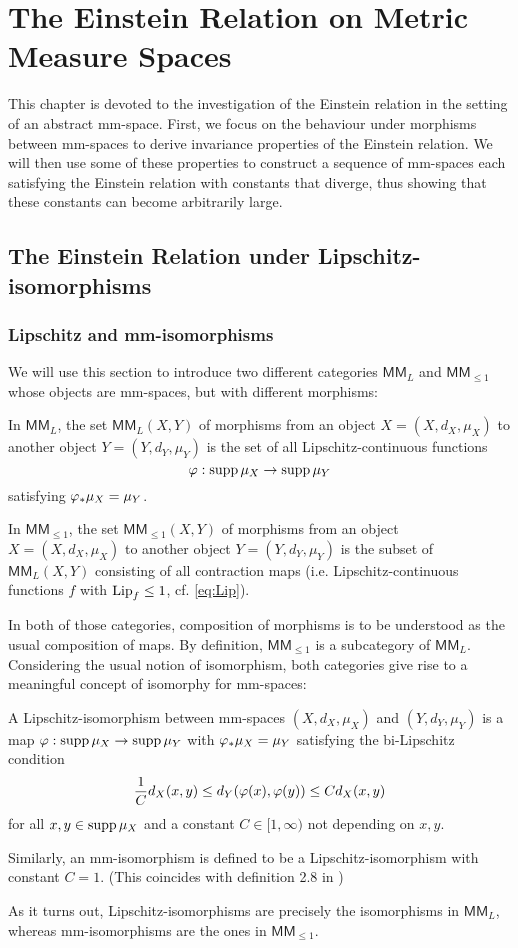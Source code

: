 \chapter{The Einstein Relation on Metric Measure Spaces}

This chapter is devoted to the investigation of the Einstein relation in the setting of an abstract mm-space. First, we focus on the behaviour under morphisms between mm-spaces to derive invariance properties of the Einstein relation.  We will then use some of these properties to construct a sequence of mm-spaces each satisfying the Einstein relation with constants that diverge, thus showing that these constants can become arbitrarily large.

\section{The Einstein Relation under Lipschitz-isomorphisms}

\subsection{Lipschitz and mm-isomorphisms}

We will use this section to introduce two different categories $\mathsf{MM}_L$ and $\mathsf{MM}_{\leq1}$ whose objects are mm-spaces, but with different morphisms: 
\begin{compactitem}
  \item In $\mathsf{MM}_L$, the set $\mathsf{MM}_L(X,Y)$ of morphisms from an object $X=(X,d_X,\mu_X)$ to another object $Y=(Y,d_Y,\mu_Y)$ is the set of all Lipschitz-continuous functions 
  \[ 
    \varphi:\operatorname{supp}\mu_X\to\operatorname{supp}\mu_Y
  \]
  satisfying $\varphi_*\mu_X=\mu_Y$.
  \item In $\mathsf{MM}_{\leq1}$, the set $\mathsf{MM}_{\leq1}(X,Y)$ of morphisms from an object $X=(X,d_X,\mu_X)$ to another object $Y=(Y,d_Y,\mu_Y)$ is the subset of $\mathsf{MM}_L(X,Y)$ consisting of all contraction maps (i.e. Lipschitz-continuous functions $f$ with $\operatorname{Lip}_f\leq1$, cf. \eqref{eq:Lip}).
\end{compactitem}
In both of those categories, composition of morphisms is to be understood as the usual composition of maps. By definition, $\mathsf{MM}_{\leq1}$ is a subcategory of $\mathsf{MM}_L$. Considering the usual notion of isomorphism, both categories give rise to a meaningful concept of isomorphy for mm-spaces: 
\begin{defin}
  A Lipschitz-isomorphism between mm-spaces $(X,d_X,\mu_X)$ and $(Y,d_Y,\mu_Y)$ is a map 
  $\varphi:\operatorname{supp}\mu_X\to\operatorname{supp}\mu_Y$ with $\varphi_*\mu_X=\mu_Y$ satisfying the bi-Lipschitz condition
  \[
    \frac{1}{C}d_X(x,y)\leq d_Y(\varphi(x),\varphi(y))\leq Cd_X(x,y)
  \]
  for all $x,y\in\operatorname{supp}\mu_X$ and a constant $C\in[1,\infty)$ not depending on $x,y$.
  
  Similarly, an mm-isomorphism is defined to be a Lipschitz-isomorphism with constant $C=1$. (This coincides with definition 2.8 in \cite{shioya2016metric})
\end{defin}
As it turns out, Lipschitz-isomorphisms are precisely the isomorphisms in $\mathsf{MM}_L$, whereas mm-isomorphisms are the ones in $\mathsf{MM}_{\leq1}$.

